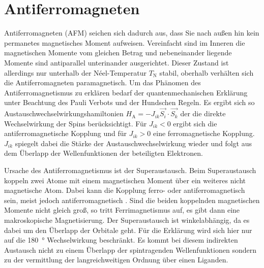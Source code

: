     \section{Antiferromagneten}
        Antiferromagneten (AFM) seichen sich dadurch aus, dass Sie nach außen hin kein permanetes magnetisches Moment aufweisen.
        Vereinfacht sind im Inneren die magnetischen Momente vom gleichen Betrag und nebeneinander liegende Momente sind antiparallel unterinander ausgerichtet.
        Dieser Zustand ist allerdings nur unterhalb der Néel-Temperatur $T_\text{N}$ stabil, oberhalb verhälten sich die Antiferromagneten paramagnetisch.
        Um das Phänomen des Antiferromagnetismus zu erklären bedarf der quantenmechanischen Erklärung unter Beachtung des Pauli Verbots und der Hundschen Regeln.
        Es ergibt sich so Austauschwechselwirkungshamiltonien $H_\text{A} = - J_{ik} \vec{S_i}\cdot\vec{S_k}$ der die direkte Wechselwirkung der Spins berücksichtigt.
        Für $J_{ik} < 0$ ergibt sich die antiferromagnetische Kopplung und für $J_{ik} > 0$ eine ferromagnetische Kopplung.
        $J_{ik}$ spiegelt dabei die Stärke der Austauschwechselwirkung wieder und folgt aus dem Überlapp der Wellenfunktionen der beteiligten Elektronen.


        Ursache des Antiferromagnetismus ist der Superaustausch.
            Beim Superaustausch koppeln zwei Atome mit einem magnetischen Moment über ein weiteres nicht magnetische Atom. 
            Dabei kann die Kopplung ferro- oder antiferromagnetisch sein, meist jedoch antiferromagnetisch \cite{AFM_1}.
            Sind die beiden koppelnden magnetischen Momente nicht gleich groß, so tritt Ferrimagnetismus auf, es gibt dann eine makroskopische Magnetisierung.
            Der Superaustausch ist winkelabhängig, da es dabei um den Überlapp der Orbitale geht.
            Für die Erklärung wird sich hier nur auf die \SI{180}{\degree} Wechselwirkung beschränkt.
            Es kommt bei diesem indirekten Austausch nicht zu einem Überlapp der spintragenden Wellenfunktionen sondern zu der vermittlung der langreichweitigen Ordnung über einen Liganden.

